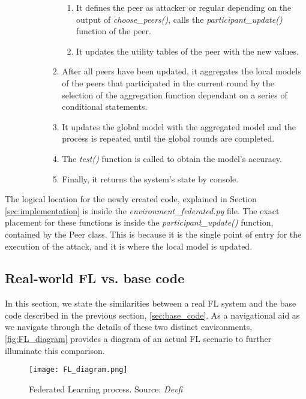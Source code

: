 \begin{itemize}
\begin{itemize}
\begin{itemize}
\begin{enumerate}
                                \begin{enumerate}
                                        \item It defines the peer as attacker or regular depending on the output of \textit{choose\_peers()}, calls the \textit{participant\_update()} function of the peer.
                                        \item It updates the utility tables of the peer with the new values.
                                \end{enumerate}
                                \item After all peers have been updated, it aggregates the local models of the peers that participated in the current round by the selection of the aggregation function dependant on a series of conditional statements.
                                \item It updates the global model with the aggregated model and the process is repeated until the global rounds are completed.
                                \item The \textit{test()} function is called to obtain the model's accuracy.
                                \item Finally, it returns the system's state by console.
                        \end{enumerate}
                \end{itemize}
        \end{itemize}
\end{itemize}
The logical location for the newly created code, explained in Section \ref{sec:implementation} is inside the \textit{environment\_federated.py} file. The exact placement for these functions is inside the \textit{participant\_update()} function, contained by the Peer class.
This is because it is the single point of entry for the execution of the attack, and it is where the local model is updated.

\subsection{Real-world FL vs. base code}
In this section, we state the similarities between a real FL system and the base code described in the previous section, \ref{sec:base_code}. As a navigational aid as we navigate through the details of these two distinct environments, \autoref{fig:FL_diagram} provides a diagram of an actual FL scenario to further illuminate this comparison. 
\begin{figure}[h]
        \centering %
        \texttt{[image: FL\_diagram.png]}
        \caption{Federated Learning process. Source: \textit{Devfi}} %
        \label{fig:FL_diagram}
\end{figure}

